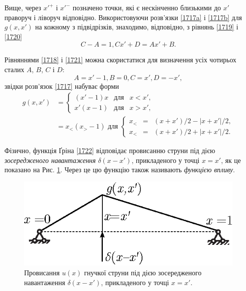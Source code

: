 \documentclass[14pt,twoside]{extreport}
\theoremstyle{mystyle}
\numberwithin{equation}{chapter}
\begin{document}
Вище, через $x'^{+}$ і $x'^{-}$ позначено точки, які є нескінченно близькими до $x'$ праворуч і ліворуч відповідно. Використовуючи розв'язки \eqref{1717a} і \eqref{1717b} для $g(x, x')$ на кожному з підвідрізків, знаходимо, відповідно, з рівнянь \eqref{1719} і \eqref{1720}
\begin{equation}\label{1721}
C-A=1, Cx'+D=Ax'+B.
\end{equation}

Рівняннями \eqref{1718} і \eqref{1721} можна скористатися для визначення усіх чотирьох сталих $A$, $B$, $C$ і $D$:
$$
A=x'-1, B=0, C=x', D=-x',
$$
звідки розв'язок \eqref{1717} набуває форми
\begin{subequations}\label{1722}
	\begin{align}
	g(x, x')&=\left\{\begin{array}{lll}
	(x'-1)x&\textrm{для}&x<x',\\
	x'(x-1)&\textrm{для}&x>x',
	\end{array}\right.\\
	&=x_{<}(x_{>}-1) \textrm{ для }\left\{\begin{array}{lll}x_{<} &=& (x+x')/2-|x+x'|/2,\\
	x_{<} &=& (x+x')/2+|x+x'|/2.\end{array}\right.
	\end{align}
\end{subequations}

Фізично, функція Ґріна \eqref{1722} відповідає провисанню струни під дією \emph{зосередженого навантаження} $\delta(x-x')$, прикладеного у точці $x=x'$, як це показано на Рис. \ref{figstring2}. Через це цю функцію також називають \emph{функцією впливу}.

\begin{figure}[ht]\centering
	\includegraphics[scale=1]{string2.eps}
	\caption{Провисання $u(x)$ гнучкої струни під дією зосередженого навантаження $\delta(x-x')$, прикладеного у точці $x=x'$.}\label{figstring2}
\end{figure}
\end{document}
